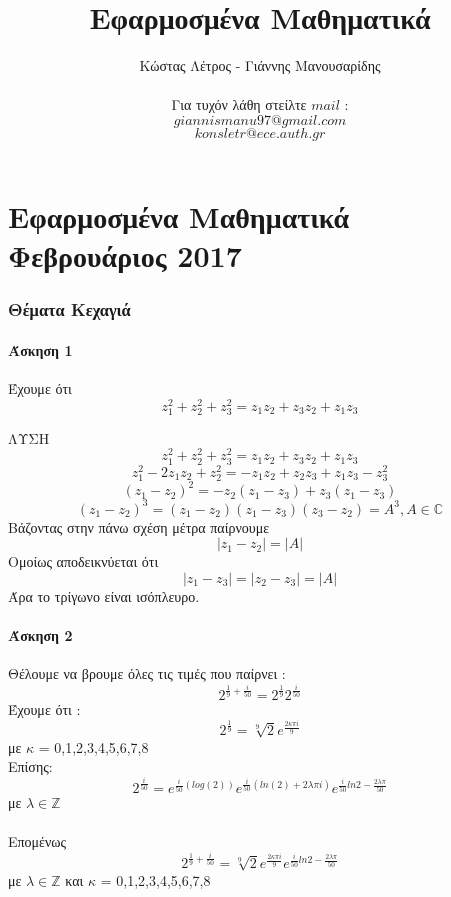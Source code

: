 \documentclass[12pt]{article}
\title{Εφαρμοσμένα Μαθηματικά}
\author{Κώστας Λέτρος - Γιάννης Μανουσαρίδης\\  
 \\Για τυχόν λάθη στείλτε $mail$ :
 \\ $giannismanu97@gmail.com$ 
 \\ $konsletr@ece.auth.gr$}
\begin{document}
  

\maketitle
\newpage
\cleardoublepage
{}
\tableofcontents
\newpage

\part{Εφαρμοσμένα Μαθηματικά Φεβρουάριος 2017}

\newpage


 \section{Θέματα Κεχαγιά}
 
 \subsection{Άσκηση 1}
Έχουμε ότι
$$
 z_{1}^{2}+z_{2}^{2}+z_{3}^{2}=z_{1}z_{2}+z_{3}z_{2}+z_{1}z_{3}
$$

ΛΥΣΗ 
$$z_{1}^{2}+z_{2}^{2}+z_{3}^{2}=z_{1}z_{2}+z_{3}z_{2}+z_{1}z_{3}$$
$$z_{1}^{2}-2z_{1}z_{2}+z_{2}^2=-z_{1}z_{2}+z_{2}z_{3}+z_{1}z_{3}-z_{3}^{2}$$
$$(z_{1}-z_{2})^{2}=-z_{2}(z_{1}-z_{3})+z_{3}(z_{1}-z_{3})$$
$$(z_{1}-z_{2})^{3}=(z_{1}-z_{2})(z_{1}-z_{3})(z_{3}-z_{2})=Α^{3} ,A\in\mathbb{C}$$
Βάζοντας στην πάνω σχέση μέτρα παίρνουμε
$$|z_{1}-z_{2}|=|A|$$
Ομοίως αποδεικνύεται ότι 
$$|z_{1}-z_{3}|=|z_{2}-z_{3}|=|A|$$
Άρα το τρίγωνο είναι ισόπλευρο.
 \subsection{Άσκηση 2}
Θέλουμε να βρουμε όλες τις τιμές που παίρνει : 
$$2^{\frac{1}{9}+\frac{i}{50}}=2^{\frac{1}{9}}2^{\frac{i}{50}}$$ 
Έχουμε ότι :$$2^{\frac{1}{9}}=\sqrt[9]{2}e^{\frac{2\kappa\pi i}{9}}$$ με $\kappa$ = 0,1,2,3,4,5,6,7,8
\\
Επίσης:
$$2^{\frac{i}{50}}=
e^{\frac{i}{50}(log(2))}
e^{\frac{i}{50}(ln(2)+2\lambda\pi i)}
e^{\frac{i}{50}ln2 - \frac{2\lambda\pi}{50}}
$$ 
με $\lambda \in\mathbb{Z}$
\\\\
Επομένως $$2^{\frac{1}{9}+\frac{i}{50}}=
\sqrt[9]{2}e^{\frac{2\kappa\pi i}{9}}
e^{\frac{i}{50}ln2 - \frac{2\lambda\pi}{50}}
$$με $\lambda \in\mathbb{Z}$ και $\kappa $ = 0,1,2,3,4,5,6,7,8
\end{document}

